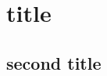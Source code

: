 \documentclass{article}
\begin{document}
\section{title}
\lipsum[1-2]

\begin{landscape}
    \section{second title}
    \lipsum[1-2]
\end{landscape}

\lipsum[1-10] %
\end{document}
